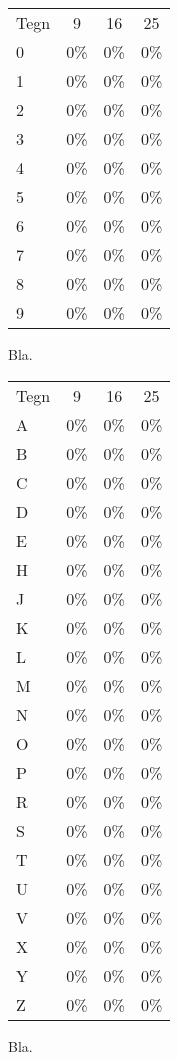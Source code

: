 \begin{figure}[htp]
\centering
\begin{tabular}{|l|c|c|c|}\hline
\rowcolor[gray]{0.9} \multicolumn{4}{|>{\columncolor[gray]{0.9}}c|}{\textbf{And}} \\ \hline
Tegn & 9 & 16 & 25\\\hline
0 & 0\% & 0\% & 0\%\\\hline
1 & 0\%  & 0\% & 0\%\\\hline
2 & 0\% & 0\% & 0\%\\\hline
3 & 0\% & 0\% & 0\%\\\hline
4 & 0\% & 0\% & 0\%\\\hline
5 & 0\% & 0\% & 0\%\\\hline
6 & 0\% & 0\% & 0\%\\\hline
7 & 0\% & 0\% & 0\%\\\hline
8 & 0\% & 0\% & 0\%\\\hline
9 & 0\% & 0\% & 0\%\\\hline
\end{tabular}
\caption{Bla.}
\label{fig:test:and_tal}
\end{figure}

\begin{figure}[htp]
\centering
\begin{tabular}{|l|c|c|c|}\hline
\rowcolor[gray]{0.9} \multicolumn{4}{|>{\columncolor[gray]{0.9}}c|}{\textbf{And}} \\ \hline
Tegn & 9 & 16 & 25\\\hline
A & 0\% & 0\% & 0\%\\\hline
B & 0\% & 0\% & 0\%\\\hline
C & 0\% & 0\% & 0\%\\\hline
D & 0\% & 0\% & 0\%\\\hline
E & 0\% & 0\% & 0\%\\\hline
H & 0\% & 0\% & 0\%\\\hline
J & 0\% & 0\% & 0\%\\\hline
K & 0\% & 0\% & 0\%\\\hline 
L & 0\% & 0\% & 0\%\\\hline
M & 0\% & 0\% & 0\%\\\hline
N & 0\% & 0\% & 0\%\\\hline
O & 0\% & 0\% & 0\%\\\hline
P & 0\% & 0\% & 0\%\\\hline
R & 0\% & 0\% & 0\%\\\hline
S & 0\% & 0\% & 0\%\\\hline
T & 0\% & 0\% & 0\%\\\hline
U & 0\% & 0\% & 0\%\\\hline
V & 0\% & 0\% & 0\%\\\hline
X & 0\% & 0\% & 0\%\\\hline
Y & 0\% & 0\% & 0\%\\\hline
Z & 0\% & 0\% & 0\%\\\hline
\end{tabular}
\caption{Bla.}
\label{fig:test:and_bogstav}
\end{figure}

